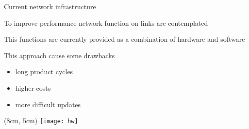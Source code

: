 \begin{frame}{Current network infrastructure}

  \vfill{}

  To improve performance network function on links are contemplated

  \vfill{}

  This functions are currently provided as a combination of hardware and
  software

  \vfill{}

  This approach cause some drawbacks
  \begin{itemize}
    \item long product cycles
    \item higher costs
    \item more difficult updates
  \end{itemize}

  \vfill{}

  \begin{textblock*}{1cm}(8cm, 5cm)
    \texttt{[image: hw]}
  \end{textblock*}

\end{frame}